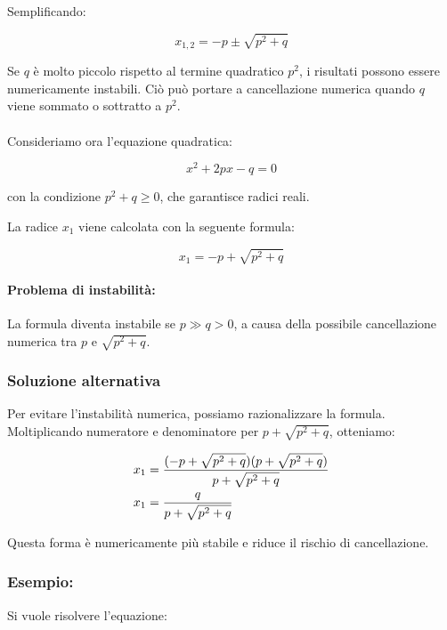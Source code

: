 \documentclass[a4paper, 11pt]{article}
\begin{document}
        Semplificando:


        \[
        x_{1,2} = -p \pm \sqrt{p^2 + q}
        \]



        Se \(q\) è molto piccolo rispetto al termine quadratico \(p^2\), i risultati possono essere numericamente instabili. Ciò può portare a cancellazione numerica quando \(q\) viene sommato o sottratto a \(p^2\).

        \paragraph{}
        Consideriamo ora l'equazione quadratica:


        \[
        x^2 + 2px - q = 0
        \]


        con la condizione \(p^2 + q \geq 0\), che garantisce radici reali.

        La radice \(x_1\) viene calcolata con la seguente formula:


        \[
        x_1 = -p + \sqrt{p^2 + q}
        \]



        \paragraph{Problema di instabilità: }
        La formula diventa instabile se \(p \gg q > 0\), a causa della possibile cancellazione numerica tra \(p\) e \(\sqrt{p^2 + q}\).

        \subsubsection*{Soluzione alternativa}
        Per evitare l'instabilità numerica, possiamo razionalizzare la formula. Moltiplicando numeratore e denominatore per \(p + \sqrt{p^2 + q}\), otteniamo:


        \begin{align}
            x_1 &= \frac{(-p + \sqrt{p^2 + q})(p + \sqrt{p^2 + q})}{p + \sqrt{p^2 + q}} \notag \\
            x_1 &= \frac{q}{p + \sqrt{p^2 + q}} \notag
        \end{align}
        
        

        Questa forma è numericamente più stabile e riduce il rischio di cancellazione.


        \subsubsection*{Esempio: }
        Si vuole risolvere l'equazione:
\end{document}

